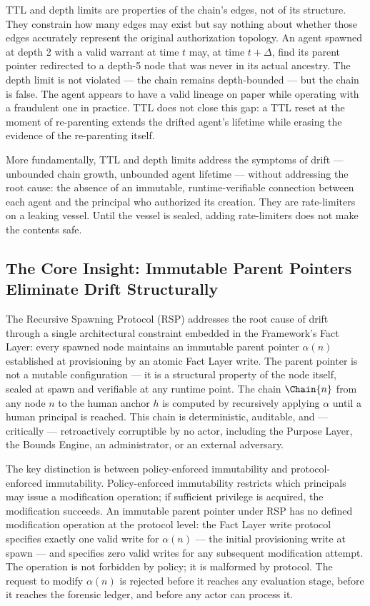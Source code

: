 TTL and depth limits are properties of the chain's edges, not of its structure. They constrain how many edges may exist but say nothing about whether those edges accurately represent the original authorization topology. An agent spawned at depth 2 with a valid warrant at time $t$ may, at time $t+\Delta$, find its parent pointer redirected to a depth-5 node that was never in its actual ancestry. The depth limit is not violated — the chain remains depth-bounded — but the chain is false. The agent appears to have a valid lineage on paper while operating with a fraudulent one in practice. TTL does not close this gap: a TTL reset at the moment of re-parenting extends the drifted agent's lifetime while erasing the evidence of the re-parenting itself.

More fundamentally, TTL and depth limits address the symptoms of drift — unbounded chain growth, unbounded agent lifetime — without addressing the root cause: the absence of an immutable, runtime-verifiable connection between each agent and the principal who authorized its creation. They are rate-limiters on a leaking vessel. Until the vessel is sealed, adding rate-limiters does not make the contents safe.

\subsection{The Core Insight: Immutable Parent Pointers Eliminate Drift Structurally}
\label{sec:core-insight}

The Recursive Spawning Protocol (RSP) addresses the root cause of drift through a single architectural constraint embedded in the \bxthree{} Framework's Fact Layer: every spawned node maintains an immutable parent pointer $\alpha(n)$ established at provisioning by an atomic Fact Layer write. The parent pointer is not a mutable configuration — it is a structural property of the node itself, sealed at spawn and verifiable at any runtime point. The chain $\Chain{n}$ from any node $n$ to the human anchor $h$ is computed by recursively applying $\alpha$ until a human principal is reached. This chain is deterministic, auditable, and — critically — retroactively corruptible by no actor, including the Purpose Layer, the Bounds Engine, an administrator, or an external adversary.

The key distinction is between policy-enforced immutability and protocol-enforced immutability. Policy-enforced immutability restricts which principals may issue a modification operation; if sufficient privilege is acquired, the modification succeeds. An immutable parent pointer under RSP has no defined modification operation at the protocol level: the Fact Layer write protocol specifies exactly one valid write for $\alpha(n)$ — the initial provisioning write at spawn — and specifies zero valid writes for any subsequent modification attempt. The operation is not forbidden by policy; it is malformed by protocol. The request to modify $\alpha(n)$ is rejected before it reaches any evaluation stage, before it reaches the forensic ledger, and before any actor can process it.

